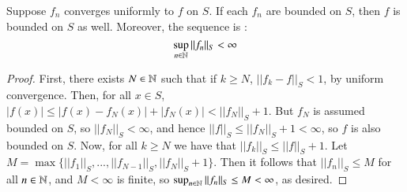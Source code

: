 \begin{lemma}
    Suppose $f_n$ converges uniformly to $f$ on $S$. If each $f_n$ are bounded on $S$, then $f$ is bounded on $S$ as well. Moreover, the sequence is : $$\sup_{n \in \mathbb N}||f_n||_S < \infty$$
\end{lemma}
\begin{proof}
    First, there exists $N \in \mathbb N$ such that if $k \geq N$, $||f_k - f||_S < 1$, by uniform convergence. Then, for all $x \in S$, $|f(x)| \leq |f(x)-f_N(x)| + |f_N(x)| < ||f_N||_S + 1$. But $f_N$ is assumed bounded on $S$, so $||f_N||_S < \infty$, and hence $||f||_S \leq ||f_N||_S + 1 < \infty$, so $f$ is also bounded on $S$. Now, for all $k \geq N$ we have that $||f_k||_S \leq ||f||_S + 1$. Let $M = \max\{||f_1||_S,...,||f_{N-1}||_S,||f_N||_S + 1\}$. Then it follows that $||f_n||_S \leq M$ for all $n \in \mathbb N$, and $M < \infty$ is finite, so $\sup_{n \in \mathbb N}||f_n||_S \leq M < \infty$, as desired.
\end{proof}



